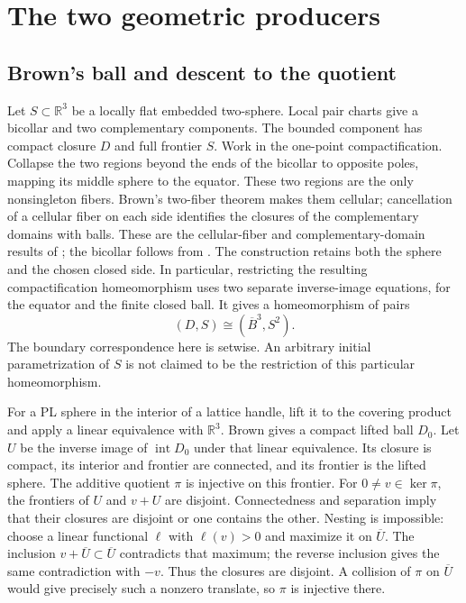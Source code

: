 \section{The two geometric producers}
\label{sec:relative-rigidity-producers}
\label{sec:constructed-inputs}

\subsection{Brown's ball and descent to the quotient}

Let $S\subset\mathbb R^3$ be a locally flat embedded two-sphere.  Local pair
charts give a bicollar and two complementary components.  The bounded
component has compact closure $D$ and full frontier $S$. Work in the
one-point compactification. Collapse the two regions beyond the ends of
the bicollar to opposite poles, mapping its middle sphere to the equator.
These two regions are the only nonsingleton fibers. Brown's two-fiber
theorem makes them cellular; cancellation of a cellular fiber on each
side identifies the closures of the complementary domains with balls.
These are the cellular-fiber and complementary-domain results of
\cite[Theorems 1--5, pp.~74--76]{Brown1960};
the bicollar follows from \cite[Theorem 3, p.~339]{Brown1962}.
The construction retains both the sphere and the chosen closed side.
In particular, restricting the resulting compactification homeomorphism
uses two separate inverse-image equations, for the equator and the finite
closed ball. It gives a
homeomorphism of pairs
\[
 (D,S)\cong(\overline B^3,S^2).
\]
The boundary correspondence here is setwise. An arbitrary initial
parametrization of $S$ is not claimed to be the restriction of this particular
homeomorphism.

For a PL sphere in the interior of a lattice handle, lift it to the
covering product and apply a
linear equivalence with $\mathbb R^3$.  Brown gives a compact lifted ball
$D_0$. Let $U$ be the inverse image of $\operatorname{int}D_0$ under that
linear equivalence. Its closure is compact, its interior and frontier are
connected, and its frontier is the lifted sphere. The additive quotient
$\pi$ is injective on this frontier. For $0\ne v\in\ker\pi$, the frontiers of
$U$ and $v+U$ are disjoint. Connectedness and separation imply that their
closures are disjoint or one contains the other. Nesting is impossible:
choose a linear functional $\ell$ with $\ell(v)>0$ and maximize it on
$\overline U$. The inclusion $v+\overline U\subset\overline U$ contradicts
that maximum; the reverse inclusion gives the same contradiction with
$-v$. Thus the closures are disjoint. A collision of $\pi$ on $\overline U$
would give precisely such a nonzero translate, so $\pi$ is injective there.

